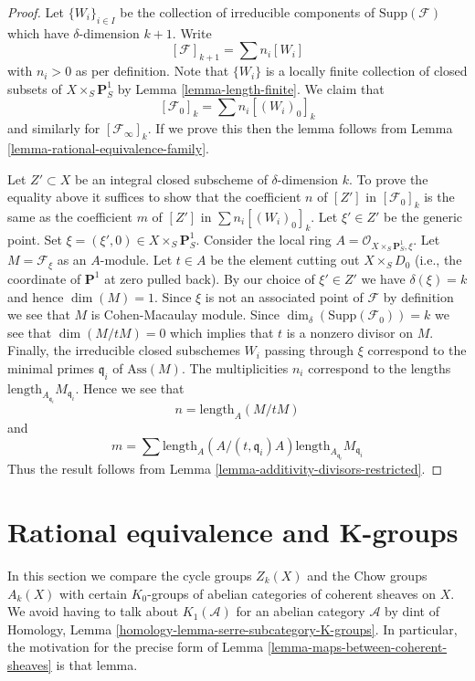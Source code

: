 \begin{proof}
Let $\{W_i\}_{i \in I}$ be the collection of irreducible
components of $\text{Supp}(\mathcal{F})$
which have $\delta$-dimension $k + 1$.
Write
$$
[\mathcal{F}]_{k + 1} = \sum n_i[W_i]
$$
with $n_i > 0$ as per definition. Note that $\{W_i\}$
is a locally finite collection of closed subsets of
$X \times_S \mathbf{P}^1_S$ by Lemma \ref{lemma-length-finite}.
We claim that
$$
[\mathcal{F}_0]_k = \sum n_i[(W_i)_0]_k
$$
and similarly for $[\mathcal{F}_\infty]_k$. If we prove this then the lemma
follows from Lemma \ref{lemma-rational-equivalence-family}.

\medskip\noindent
Let $Z' \subset X$ be an integral closed subscheme of $\delta$-dimension $k$.
To prove the equality above it suffices to show that the coefficient $n$
of $[Z']$ in $[\mathcal{F}_0]_k$ is the same as the coefficient $m$ of
$[Z']$ in $\sum n_i[(W_i)_0]_k$. Let $\xi' \in Z'$ be the generic point.
Set $\xi = (\xi', 0) \in  X \times_S \mathbf{P}^1_S$.
Consider the local ring $A = \mathcal{O}_{X \times_S \mathbf{P}^1_S, \xi}$.
Let $M = \mathcal{F}_\xi$ as an $A$-module.
Let $t \in A$ be the element cutting out $X \times_S D_0$
(i.e., the coordinate of $\mathbf{P}^1$ at zero pulled back).
By our choice of $\xi' \in Z'$ we have $\delta(\xi) = k$
and hence $\dim(M) = 1$. Since $\xi$ is not an associated point
of $\mathcal{F}$ by definition we see that $M$ is Cohen-Macaulay module.
Since $\dim_\delta(\text{Supp}(\mathcal{F}_0)) = k$
we see that $\dim(M/tM) = 0$ which implies that $t$
is a nonzero divisor on $M$. Finally, the irreducible closed subschemes
$W_i$ passing through $\xi$ correspond to the minimal primes
$\mathfrak q_i$ of $\text{Ass}(M)$. The multiplicities $n_i$ correspond
to the lengths $\text{length}_{A_{\mathfrak q_i}}M_{\mathfrak q_i}$.
Hence we see that
$$
n = \text{length}_A(M/tM)
$$
and
$$
m = \sum
\text{length}_A(A/(t, \mathfrak q_i)A) 
\text{length}_{A_{\mathfrak q_i}}M_{\mathfrak q_i}
$$
Thus the result follows from
Lemma \ref{lemma-additivity-divisors-restricted}.
\end{proof}





\section{Rational equivalence and K-groups}
\label{section-rational-equivalence-K-groups}

\noindent
In this section we compare the cycle groups $Z_k(X)$ and
the Chow groups $A_k(X)$ with certain $K_0$-groups of
abelian categories of coherent sheaves on $X$. We avoid having
to talk about $K_1(\mathcal{A})$ for an abelian category
$\mathcal{A}$ by dint of
Homology, Lemma \ref{homology-lemma-serre-subcategory-K-groups}.
In particular, the motivation for the precise form of
Lemma \ref{lemma-maps-between-coherent-sheaves} is that lemma.

